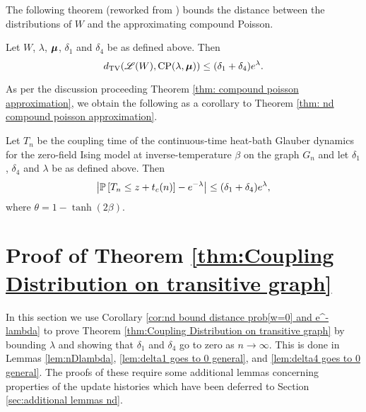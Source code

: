 	The following theorem (reworked from \cite{Barbour2001-nh}) bounds the distance between the distributions of $W$ and the approximating compound Poisson.

	\begin{theorem}
	\label{thm: nd compound poisson approximation}
		Let $W$, $\lambda$, ${\bm{{\mu}}}$, $\delta_1$ and $\delta_4$ be as defined above. Then
		\begin{equation}
			d_{\mathrm{TV}}(\mathscr{L}(W), \mathrm{CP}(\lambda, {\bm{{\mu}}})) \leq (\delta_1 + \delta_4)e^\lambda.
		\end{equation}
	\end{theorem}
	As per the discussion proceeding Theorem \ref{thm: compound poisson approximation}, we obtain the following as a corollary to Theorem \ref{thm: nd compound poisson approximation}.
	\begin{corollary}
		\label{cor:nd bound distance prob[w=0] and e^-lambda}
		Let $T_n$ be the coupling time of the continuous-time heat-bath Glauber dynamics for the zero-field Ising model at inverse-temperature $\beta$ on the graph $G_n$ and let $\delta_1$, $\delta_4$ and $\lambda$ be as defined above. Then
		\begin{equation}
			\left|\mathbb{P}\left[T_n \leq z + t_c(n)\right] - e^{-\lambda}\right| \leq (\delta_1 + \delta_4)e^\lambda,
			\label{eq:nd bound distance prob[w=0] and e^-lambda}
		\end{equation}
		where $\theta = 1 - \tanh(2\beta)$.
	\end{corollary}

\section{Proof of Theorem \ref{thm:Coupling Distribution on transitive graph}}
\label{sec:proof thm coupling nd}
	In this section we use Corollary \ref{cor:nd bound distance prob[w=0] and e^-lambda} to prove Theorem \ref{thm:Coupling Distribution on transitive graph} by bounding $\lambda$ and showing that $\delta_1$ and $\delta_4$ go to zero as $n \rightarrow \infty$. This is done in Lemmas \ref{lem:nDlambda}, \ref{lem:delta1 goes to 0 general}, and \ref{lem:delta4 goes to 0 general}. The proofs of these require some additional lemmas concerning properties of the update histories which have been deferred to Section \ref{sec:additional lemmas nd}.

